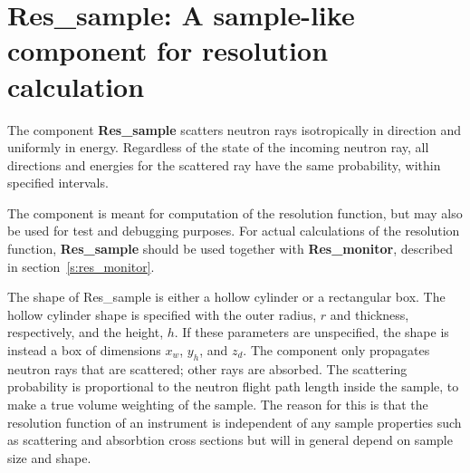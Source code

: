 \section{Res\_sample: A sample-like component for resolution calculation}
\label{s:res_sample}


The component \textbf{Res\_sample} scatters neutron rays isotropically
in direction and uniformly in energy.
Regardless of the state of the incoming neutron ray,
all directions and energies for the scattered ray have the same probability,
within specified intervals.

The component is meant
for computation of the resolution function, but may also be used
for test and debugging purposes. For actual calculations of the resolution
function, \textbf{Res\_sample} should be used
together with \textbf{Res\_monitor}, described in
section~\ref{s:res_monitor}.

The shape of \textrm{Res\_sample} is either a hollow cylinder
or a rectangular box.
The hollow cylinder shape is
specified with the outer radius, $r$ and thickness,
respectively, and the height, $h$.
If these parameters are unspecified,
the shape is instead a box of dimensions $x_w$, $y_h$, and $z_d$.
%
%
The component only propagates neutron rays that are scattered;
other rays are absorbed. The scattering probability is proportional to the neutron
flight path length inside the sample, to make a true volume weighting
of the sample. The reason for this is that the resolution
function of an instrument is independent of any sample properties
such as scattering and absorbtion cross sections but will in general
depend on sample size and shape.

